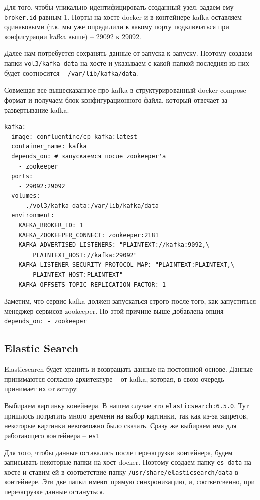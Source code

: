 Для того, чтобы уникально идентифицировать созданный узел, задаем ему
\verb|broker.id| равным 1. Порты на хосте docker и в контейнере kafka оставляем
одинаковыми (т.к. мы уже опредилили к какому порту подключаться при конфигурации
kafka выше) -- 29092 к 29092.

Далее нам потребуется сохранять данные от запуска к запуску. Поэтому создаем
папки \verb|vol3/kafka-data| на хосте и указываем с какой папкой последняя из
них будет соотносится -- \verb|/var/lib/kafka/data|.

Совмещая все вышесказанное про kafka в структурированный docker-compose формат и
получаем блок конфигурационного файла, который отвечает за развертывание kafka.
\begin{verbatim}
kafka:
  image: confluentinc/cp-kafka:latest
  container_name: kafka
  depends_on: # запускаемся после zookeeper'а
    - zookeeper
  ports:
    - 29092:29092
  volumes:
    - ./vol3/kafka-data:/var/lib/kafka/data
  environment:
    KAFKA_BROKER_ID: 1
    KAFKA_ZOOKEEPER_CONNECT: zookeeper:2181
    KAFKA_ADVERTISED_LISTENERS: "PLAINTEXT://kafka:9092,\
        PLAINTEXT_HOST://kafka:29092"
    KAFKA_LISTENER_SECURITY_PROTOCOL_MAP: "PLAINTEXT:PLAINTEXT,\
        PLAINTEXT_HOST:PLAINTEXT"
    KAFKA_OFFSETS_TOPIC_REPLICATION_FACTOR: 1
\end{verbatim}

Заметим, что сервис kafka должен запускаться строго после того, как запуститься
менеджер сервисов zookeeper. По этой причине выше добавлена опция
\verb|depends_on: - zookeeper|


\subsection{Elastic Search}
Elasticsearch будет хранить и возвращать данные на постоянной основе. Данные
принимаются согласно архитектуре -- от kafka, которая, в свою очередь принимает
их от scrapy.

Выбираем картинку конейнера. В нашем случае это \verb|elasticsearch:6.5.0|. Тут
пришлось потратить много времени на выбор картинки, так как из-за запретов,
некоторые картинки невозможно было скачать. Сразу же выбираем имя для
работающего контейнера -- \verb|es1|

Для того, чтобы данные оставались после перезагрузки контейнера, будем
записывать некоторые папки на хост docker. Поэтому создаем папку \verb|es-data|
на хосте и ставим ей в соответствие папку \verb|/usr/share/elasticsearch/data| в
контейнере. Эти две папки имеют прямую синхронизацию, и, соответсвенно, при
перезагрузке данные остануться.


